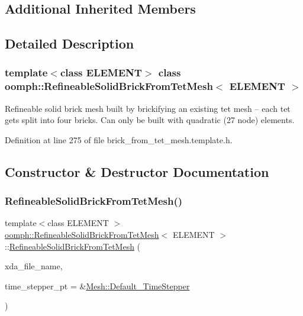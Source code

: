 \subsection*{Additional Inherited Members}


\subsection{Detailed Description}
\subsubsection*{template$<$class E\+L\+E\+M\+E\+NT$>$\newline
class oomph\+::\+Refineable\+Solid\+Brick\+From\+Tet\+Mesh$<$ E\+L\+E\+M\+E\+N\+T $>$}

Refineable solid brick mesh built by brickifying an existing tet mesh -- each tet gets split into four bricks. Can only be built with quadratic (27 node) elements. 

Definition at line 275 of file brick\+\_\+from\+\_\+tet\+\_\+mesh.\+template.\+h.



\subsection{Constructor \& Destructor Documentation}
\mbox{\label{classoomph_1_1RefineableSolidBrickFromTetMesh_a21676e62a225b6d698af7a58de4e3553}} 
\subsubsection{\texorpdfstring{Refineable\+Solid\+Brick\+From\+Tet\+Mesh()}{RefineableSolidBrickFromTetMesh()}\hspace{0.1cm}{\footnotesize\ttfamily [1/2]}}
{\footnotesize\ttfamily template$<$class E\+L\+E\+M\+E\+NT $>$ \\
\hyperlink{classoomph_1_1RefineableSolidBrickFromTetMesh}{oomph\+::\+Refineable\+Solid\+Brick\+From\+Tet\+Mesh}$<$ E\+L\+E\+M\+E\+NT $>$\+::\hyperlink{classoomph_1_1RefineableSolidBrickFromTetMesh}{Refineable\+Solid\+Brick\+From\+Tet\+Mesh} (\begin{DoxyParamCaption}\item[{const std\+::string}]{xda\+\_\+file\+\_\+name,  }\item[{\hyperlink{classoomph_1_1TimeStepper}{Time\+Stepper} $\ast$}]{time\+\_\+stepper\+\_\+pt = {\ttfamily \&\hyperlink{classoomph_1_1Mesh_a12243d0fee2b1fcee729ee5a4777ea10}{Mesh\+::\+Default\+\_\+\+Time\+Stepper}} }\end{DoxyParamCaption})\hspace{0.3cm}{\ttfamily [inline]}}



